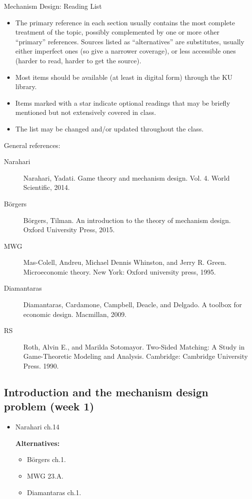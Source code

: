 \documentclass{article}
\begin{document}
\begin{center}
	{\huge Mechanism Design: Reading List}
\end{center}
\bigskip

\begin{itemize}
	\item The primary reference in each section usually contains the most complete treatment of the topic, possibly complemented by one or more other ``primary'' references. Sources listed as ``alternatives'' are substitutes, usually either imperfect ones (so give a narrower coverage), or less accessible ones (harder to read, harder to get the source). 
	
	\item Most items should be available (at least in digital form) through the KU library.
	
	\item Items marked with a star indicate optional readings that may be briefly mentioned but not extensively covered in class.
	
	\item The list may be changed and/or updated throughout the class.
\end{itemize}


\bigskip 

General references:
\begin{description} 
	\item[Narahari] Narahari, Yadati. Game theory and mechanism design. Vol. 4. World Scientific, 2014.
	\item[B{\"o}rgers] B{\"o}rgers, Tilman. An introduction to the theory of mechanism design. Oxford University Press, 2015.
	\item[MWG] Mas-Colell, Andreu, Michael Dennis Whinston, and Jerry R. Green. Microeconomic theory. New York: Oxford university press, 1995.
	\item[Diamantaras] Diamantaras, Cardamone, Campbell, Deacle, and Delgado. A toolbox for economic design. Macmillan, 2009.
	\item[RS] Roth, Alvin E., and Marilda Sotomayor. Two-Sided Matching: A Study in Game-Theoretic Modeling and Analysis. Cambridge: Cambridge University Press. 1990.
\end{description}
\medskip

\subsection{Introduction and the mechanism design problem (week 1)}
\begin{itemize}
	\item Narahari ch.14
	
	\textbf{Alternatives:}
	\begin{itemize}
		\item B{\"o}rgers ch.1.
		\item MWG 23.A.
		\item Diamantaras ch.1.
	\end{itemize}
\end{itemize}
\end{document}
